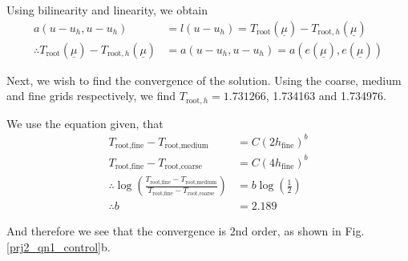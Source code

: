 \begin{enumerate}[label=(\alph*),leftmargin=*,itemsep=0mm]
    Using bilinearity and linearity, we obtain
    \begin{align*}
        a(u-u_h,u-u_h) &= l(u-u_h) = T_\text{root}(\underline{\mu}) - T_{\text{root},h}(\underline{\mu}) \\
        \therefore T_\text{root}(\underline{\mu}) - T_{\text{root},h}(\underline{\mu})
        &= a(u-u_h,u-u_h) = a(e(\underline{\mu}), e(\underline{\mu}))
    \end{align*}
    
    Next, we wish to find the convergence of the solution.  Using the coarse, medium and fine grids respectively, we find $T_{\text{root},h} = 1.731266$, 1.734163 and 1.734976.
    
    We use the equation given, that
    \begin{align*}
        T_{\text{root},\text{fine}} - T_{\text{root},\text{medium}} &= C (2h_\text{fine})^b \\
        T_{\text{root},\text{fine}} - T_{\text{root},\text{coarse}} &= C (4h_\text{fine})^b \\
        \therefore \log(\frac{T_{\text{root},\text{fine}} - T_{\text{root},\text{medium}}}{T_{\text{root},\text{fine}} - T_{\text{root},\text{coarse}}}) &= b\log(\frac{1}{2}) \\
        \therefore b &= 2.189
    \end{align*}
    
    And therefore we see that the convergence is 2nd order, as shown in Fig. \ref{prj2_qn1_control}b.
    
\end{enumerate}